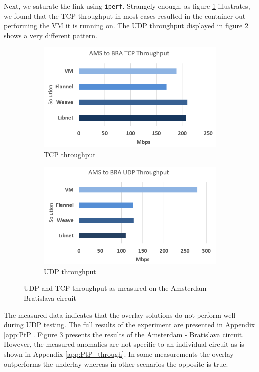 Next, we saturate the link using \texttt{iperf}. Strangely enough, as figure \ref{fig:sub1} illustrates, we found that the TCP throughput in most cases resulted in the container out-performing the VM it is running on. The UDP throughput displayed in figure \ref{fig:sub2} shows a very different pattern. 

\begin{figure}[H]
\centering
\begin{subfigure}{.5\textwidth}
  \centering
  \includegraphics[scale=0.5]{img/PtP_All_TCP.PNG}
  \caption{TCP throughput}
  \label{fig:sub1}
\end{subfigure}%
\begin{subfigure}{.5\textwidth}
  \centering
  \includegraphics[scale=0.5]{img/PtP_All_UDP.PNG}
  \caption{UDP throughput}
  \label{fig:sub2}
\end{subfigure}
\caption{UDP and TCP throughput as measured on the Amsterdam - Bratislava circuit}
\label{fig:UDP_TCP_MSMT}
\end{figure}

The measured data indicates that the overlay solutions do not perform well during UDP testing. The full results of the experiment are presented in Appendix \ref{app:PtP}. Figure \ref{fig:UDP_TCP_MSMT} presents the results of the Amsterdam - Bratislava circuit. However, the measured anomalies are not specific to an individual circuit as is shown in Appendix \ref{app:PtP_through}. In some measurements the overlay outperforms the underlay whereas in other scenarios the opposite is true. 

